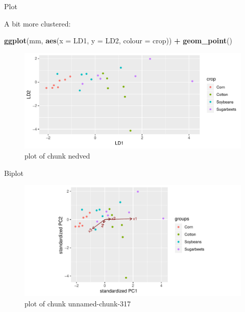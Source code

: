 \documentclass[ignorenonframetext,]{beamer}
\newenvironment{Shaded}{\begin{snugshade}}{\end{snugshade}}
\newcommand{\DataTypeTok}[1]{\textcolor[rgb]{0.13,0.29,0.53}{#1}}
\newcommand{\KeywordTok}[1]{\textcolor[rgb]{0.13,0.29,0.53}{\textbf{#1}}}
\newcommand{\NormalTok}[1]{#1}
\newcommand{\OperatorTok}[1]{\textcolor[rgb]{0.81,0.36,0.00}{\textbf{#1}}}
\newcommand{\StringTok}[1]{\textcolor[rgb]{0.31,0.60,0.02}{#1}}
\begin{document}
\begin{frame}[fragile]{Plot}
\protect\hypertarget{plot}{}

A bit more clustered:

\begin{Shaded}
\begin{Highlighting}[]
\KeywordTok{ggplot}\NormalTok{(mm, }\KeywordTok{aes}\NormalTok{(}\DataTypeTok{x =}\NormalTok{ LD1, }\DataTypeTok{y =}\NormalTok{ LD2, }\DataTypeTok{colour =}\NormalTok{ crop)) }\OperatorTok{+}
\StringTok{  }\KeywordTok{geom_point}\NormalTok{()}
\end{Highlighting}
\end{Shaded}

\begin{figure}
\centering
\includegraphics{figure/nedved-1.pdf}
\caption{plot of chunk nedved}
\end{figure}

\end{frame}

\begin{frame}[fragile]{Biplot}
\protect\hypertarget{biplot-1}{}

\begin{Shaded}
\end{Shaded}

\begin{figure}
\centering
\includegraphics{figure/unnamed-chunk-317-1.pdf}
\caption{plot of chunk unnamed-chunk-317}
\end{figure}

\end{frame}
\end{document}
